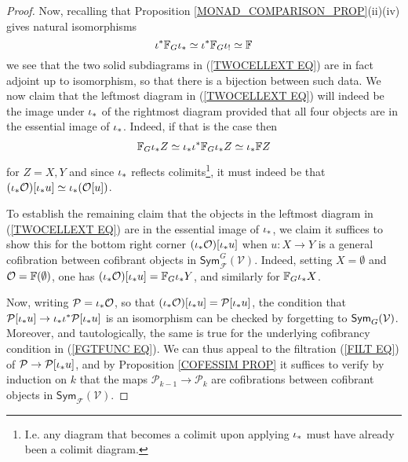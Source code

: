 \documentclass[a4paper,10pt]{article}%
\begin{document}
\begin{proof}
%
Now, recalling that Proposition \ref{MONAD_COMPARISON_PROP}(ii)(iv) gives natural isomorphisms 
\[
\iota^{\**} \mathbb{F}_{G} \iota_{\**} \simeq
\iota^{\**} \mathbb{F}_{G} \iota_{!} \simeq
\mathbb{F}
\]
we see that the two solid subdiagrams in 
(\ref{TWOCELLEXT EQ})
are in fact adjoint up to isomorphism, so that there is a bijection between such data. 
We now claim that the leftmost diagram in
(\ref{TWOCELLEXT EQ})
will indeed be the image under $\iota_{\**}$
of the rightmost diagram
provided that all four objects 
are in the essential image of $\iota_{\**}$.
Indeed, 
if that is the case then
\begin{align*}
	\mathbb{F}_G \iota_{\**} Z \simeq 
	\iota_{\**} \iota^{\**} \mathbb{F}_G \iota_{\**} Z \simeq
	\iota_{\**} \mathbb{F} Z
\end{align*}
for $Z=X,Y$
and since $\iota_{\**}$ reflects colimits\footnote{I.e. any diagram that becomes a colimit upon applying $\iota_{\**}$ must have already been a colimit diagram.},
it must indeed be that
$(\iota_{\**} \mathcal{O})[\iota_{\**} u]
\simeq \iota_{\**} (\mathcal{O}[u])$.

To establish the remaining claim that the objects 
in the leftmost diagram in
(\ref{TWOCELLEXT EQ})
are in the essential image of $\iota_{\**}$,
we claim
it suffices to show this for the bottom right corner 
$(\iota_{\**} \mathcal{O})[\iota_{\**} u]$ when $u \colon X \to Y$ is a general cofibration between cofibrant objects in 
$\mathsf{Sym}^{G}_{\mathcal{F}}(\mathcal{V})$.
Indeed, setting  $X=\emptyset$ and $\mathcal{O}=\mathbb{F} (\emptyset)$, 
one has 
$(\iota_{\**} \mathcal{O})[\iota_{\**} u] = 
\mathbb{F}_{G} \iota_{\**} Y$, and similarly for $\mathbb{F}_{G} \iota_{\**} X$.

Now, writing $\mathcal{P} = \iota_{\**} \mathcal{O}$, so that 
$(\iota_{\**} \mathcal{O})[\iota_{\**} u] = \mathcal{P}[\iota_{\**} u]$,
the condition that
$\mathcal{P}[\iota_{\**} u] \to \iota_{\**} \iota^{\**} \mathcal{P}[\iota_{\**} u]$
is an isomorphism 
can be checked by forgetting to 
$\mathsf{Sym}_G(\mathcal V)$.
Moreover, and tautologically,
the same is true for the underlying cofibrancy condition in 
(\ref{FGTFUNC EQ}).
We can thus appeal to the filtration 
(\ref{FILT EQ}) of
$\mathcal{P} \to \mathcal{P}[\iota_{\**} u]$,
and by
Proposition \ref{COFESSIM PROP}
it suffices
to verify by induction on $k$
that the maps 
$\mathcal{P}_{k-1} \to \mathcal{P}_k$ 
are cofibrations between cofibrant objects in
$\mathsf{Sym}_{\mathcal{F}}(\mathcal{V})$.


\end{proof}
\end{document}
